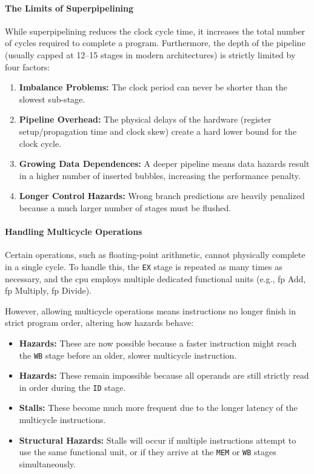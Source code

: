 \paragraph{The Limits of Superpipelining}
While superpipelining reduces the clock cycle time, it increases the total number of cycles required to complete a program. Furthermore, the depth of the pipeline (usually capped at 12--15 stages in modern architectures) is strictly limited by four factors:
\begin{enumerate}
    \item \textbf{Imbalance Problems:} The clock period can never be shorter than the slowest sub-stage.
    \item \textbf{Pipeline Overhead:} The physical delays of the hardware (register setup/propagation time and clock skew) create a hard lower bound for the clock cycle.
    \item \textbf{Growing Data Dependences:} A deeper pipeline means data hazards result in a higher number of inserted bubbles, increasing the performance penalty.
    \item \textbf{Longer Control Hazards:} Wrong branch predictions are heavily penalized because a much larger number of stages must be flushed.
\end{enumerate}

\paragraph{Handling Multicycle Operations}
Certain operations, such as floating-point arithmetic, cannot physically complete in a single cycle. To handle this, the \texttt{EX} stage is repeated as many times as necessary, and the \gls{cpu} employs multiple dedicated functional units (e.g., \gls{fp} Add, \gls{fp} Multiply, \gls{fp} Divide). 

However, allowing multicycle operations means instructions no longer finish in strict program order, altering how hazards behave:
\begin{itemize}
    \item \textbf{ Hazards:} These are now possible because a faster instruction might reach the \texttt{WB} stage before an older, slower multicycle instruction.
    \item \textbf{ Hazards:} These remain impossible because all operands are still strictly read in order during the \texttt{ID} stage.
    \item \textbf{ Stalls:} These become much more frequent due to the longer latency of the multicycle instructions.
    \item \textbf{Structural Hazards:} Stalls will occur if multiple instructions attempt to use the same functional unit, or if they arrive at the \texttt{MEM} or \texttt{WB} stages simultaneously.
\end{itemize}

